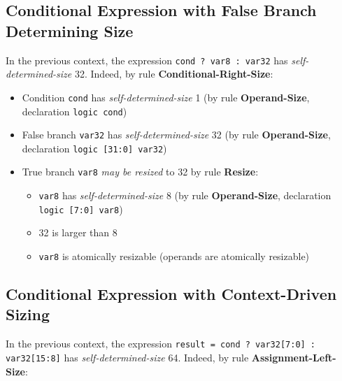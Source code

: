 \documentclass{article}
\newcommand{\sv}[1]{\texttt{#1}}
\newcommand{\sds}{\emph{self-determined-size}}
\newcommand{\mbr}{\emph{may be resized}}
\begin{document}
\subsection{Conditional Expression with False Branch Determining Size}

In the previous context, the expression \sv{cond ? var8 : var32} has
\sds{} 32. Indeed, by rule
\textbf{Conditional-Right-Size}:

\begin{itemize}
  \item Condition \sv{cond} has \sds{} 1 (by rule
    \textbf{Operand-Size}, declaration \sv{logic cond})
  \item False branch \sv{var32} has \sds{} 32 (by rule
    \textbf{Operand-Size}, declaration \sv{logic [31:0] var32})
  \item True branch \sv{var8} \mbr{} to 32 by rule
    \textbf{Resize}:
    \begin{itemize}
      \item \sv{var8} has \sds{} 8 (by rule
        \textbf{Operand-Size}, declaration \sv{logic [7:0] var8})
      \item 32 is larger than 8
      \item \sv{var8} is atomically resizable (operands are atomically
        resizable)
    \end{itemize}
\end{itemize}

\subsection{Conditional Expression with Context-Driven Sizing}

In the previous context, the expression
\sv{result = cond ? var32[7:0] : var32[15:8]} has \sds{}
64. Indeed, by rule \textbf{Assignment-Left-Size}:
\end{document}
